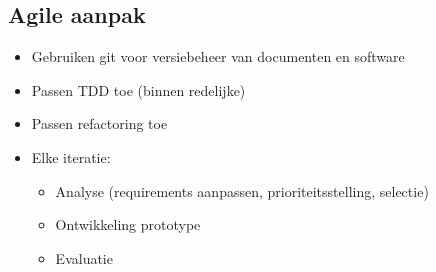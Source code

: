 \subsection{Agile aanpak}

\begin{itemize}
 \item Gebruiken git voor versiebeheer van documenten en software
 \item Passen TDD toe (binnen redelijke)
 \item Passen refactoring toe
 \item Elke iteratie:
 \begin{itemize}
   \item Analyse (requirements aanpassen, prioriteitsstelling, selectie)
   \item Ontwikkeling prototype
   \item Evaluatie
 \end{itemize}
\end{itemize}
